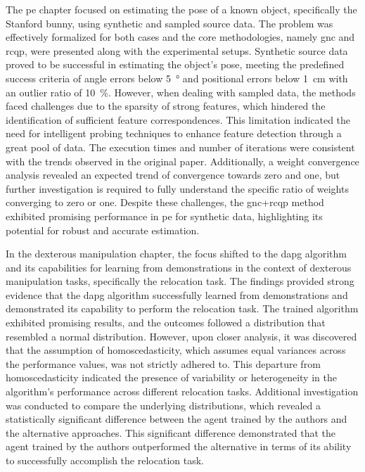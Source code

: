 The \gls{pe} chapter focused on estimating the pose of a known object, specifically the Stanford bunny, using synthetic and sampled source data. The problem was effectively formalized for both cases and the core methodologies, namely \gls{gnc} and \gls{rcqp}, were presented along with the experimental setups. Synthetic source data proved to be successful in estimating the object's pose, meeting the predefined success criteria of angle errors below \SI{5}{\degree} and positional errors below \SI{1}{cm} with an outlier ratio of \SI{10}{\percent}. However, when dealing with sampled data, the methods faced challenges due to the sparsity of strong features, which hindered the identification of sufficient feature correspondences. This limitation indicated the need for intelligent probing techniques to enhance feature detection through a great pool of data. The execution times and number of iterations were consistent with the trends observed in the original paper. Additionally, a weight convergence analysis revealed an expected trend of convergence towards zero and one, but further investigation is required to fully understand the specific ratio of weights converging to zero or one. Despite these challenges, the \gls{gnc}+\gls{rcqp} method exhibited promising performance in \gls{pe} for synthetic data, highlighting its potential for robust and accurate estimation. \medskip

In the dexterous manipulation chapter, the focus shifted to the \gls{dapg} algorithm and its capabilities for learning from demonstrations in the context of dexterous manipulation tasks, specifically the relocation task. The findings provided strong evidence that the \gls{dapg} algorithm successfully learned from demonstrations and demonstrated its capability to perform the relocation task. The trained algorithm exhibited promising results, and the outcomes followed a distribution that resembled a normal distribution. However, upon closer analysis, it was discovered that the assumption of homoscedasticity, which assumes equal variances across the performance values, was not strictly adhered to. This departure from homoscedasticity indicated the presence of variability or heterogeneity in the algorithm's performance across different relocation tasks. Additional investigation was conducted to compare the underlying distributions, which revealed a statistically significant difference between the agent trained by the authors and the alternative approaches. This significant difference demonstrated that the agent trained by the authors outperformed the alternative in terms of its ability to successfully accomplish the relocation task. \medskip

